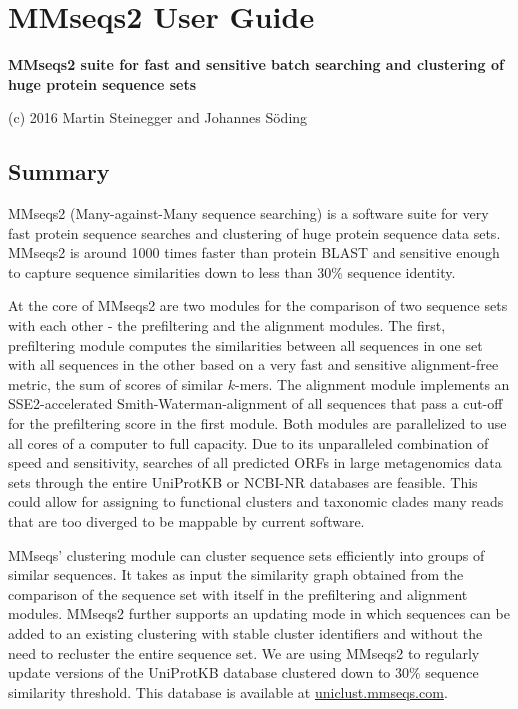 \documentclass[11pt,a4paper]{scrreprt}
\begin{document}
\chapter*{MMseqs2 User Guide}
\renewcommand*\thesection{\arabic{section}}

\textbf{MMseqs2 suite for fast and sensitive batch searching and clustering of huge protein sequence sets}

(c) 2016 Martin Steinegger and Johannes S\"oding
\section{Summary}

MMseqs2 (Many-against-Many sequence searching) is a software suite for very fast protein sequence searches and clustering of huge protein sequence data sets. MMseqs2 is around 1000 times faster than protein BLAST and sensitive enough to capture sequence similarities down to less than 30\% sequence identity.

At the core of MMseqs2 are two modules for the comparison of two sequence sets with each other - the prefiltering and the alignment modules. The first, prefiltering module computes the similarities between all sequences in one set with all sequences in the other based on a very fast and sensitive alignment-free metric, the sum of scores of similar $k$-mers. The alignment module implements an SSE2-accelerated Smith-Waterman-alignment of all sequences that pass a cut-off for the prefiltering score in the first module. Both modules are parallelized to use all cores of a computer to full capacity. Due to its unparalleled combination of speed and sensitivity, searches of all predicted ORFs in large metagenomics data sets through the entire UniProtKB or NCBI-NR databases are feasible. This could allow for assigning to functional clusters and taxonomic clades many reads that are too diverged to be mappable by current software.

MMseqs' clustering module can cluster sequence sets efficiently into groups of similar sequences. It takes as input the similarity graph obtained from the comparison of the sequence set with itself in the prefiltering and alignment modules. MMseqs2 further supports an updating mode in which sequences can be added to an existing clustering with stable cluster identifiers and without the need to recluster the entire sequence set. We are using MMseqs2 to regularly update versions of the UniProtKB database clustered down to 30\% sequence similarity threshold. This database is available at \href{https://uniclust.mmseqs.com}{uniclust.mmseqs.com}.
\end{document}
